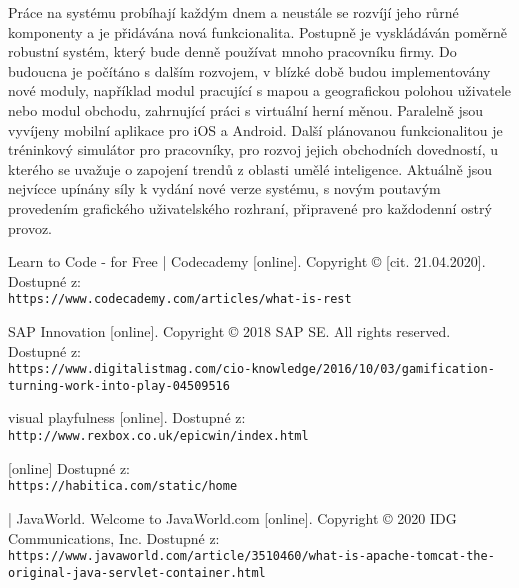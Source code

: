 \documentclass[twoside, 12pt]{article}
\begin{document}
{{Práce na systému probíhají každým dnem a neustále se rozvíjí jeho růrné komponenty a je přidávána nová funkcionalita.
Postupně je vyskládáván poměrně robustní systém, který bude denně používat mnoho pracovníku firmy.
Do budoucna je počítáno s dalším rozvojem, v blízké době budou implementovány nové moduly,
například modul pracující s mapou a geografickou polohou uživatele nebo modul obchodu, zahrnující práci s virtuální herní měnou.
Paralelně jsou vyvíjeny mobilní aplikace pro iOS a Android.
Další plánovanou funkcionalitou je tréninkový simulátor pro pracovníky, pro rozvoj jejich obchodních dovedností,
u kterého se uvažuje o zapojení trendů z oblasti umělé inteligence.
Aktuálně jsou nejvícce upínány síly k vydání nové verze systému, s novým poutavým provedením grafického uživatelského rozhraní,
připravené pro každodenní ostrý provoz.


\begin{literatura}

{
 Learn to Code - for Free | Codecademy [online].
Copyright © [cit. 21.04.2020].
Dostupné z:
\\
\texttt{https://www.codecademy.com/articles/what-is-rest}
}

{
SAP Innovation [online]. Copyright © 2018 SAP SE. All rights reserved.
Dostupné z:
\\
\texttt{https://www.digitalistmag.com/cio-knowledge/2016/10/03/gamification-turning-work-into-play-04509516}
}

{
 visual playfulness [online].
Dostupné z:
\texttt{http://www.rexbox.co.uk/epicwin/index.html}
}

{
 [online]
Dostupné z:
\\
\texttt{https://habitica.com/static/home}
}

{
 | JavaWorld.
Welcome to JavaWorld.com [online]. Copyright © 2020 IDG Communications, Inc.
Dostupné z:
\\
\texttt{https://www.javaworld.com/article/3510460/what-is-apache-tomcat-the-original-java-servlet-container.html}
}


\end{literatura}}}
\end{document}
